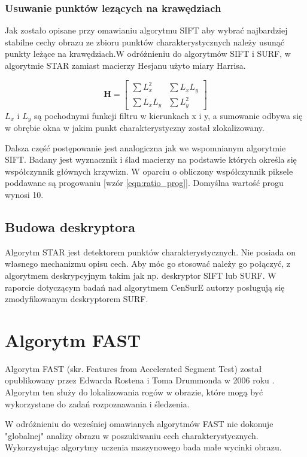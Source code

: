\subsubsection{Usuwanie punktów lezących na krawędziach}
Jak zostało opisane przy omawianiu algorytmu SIFT aby wybrać najbardziej stabilne cechy obrazu ze zbioru punktów charakterystycznych należy usunąć punkty leżące na krawędziach.W odróżnieniu do algorytmów SIFT i SURF, w algorytmie STAR zamiast macierzy Hesjanu użyto miary Harrisa.

\begin{equation}
\textbf{H} = 
\left[\begin{array}{cc}
\sum L_{x}^2&\sum L_{x}L_{y}\\
\sum L_{x}L_{y}&\sum L_{y}^2
\end{array}\right]
\end{equation}
$L_{x}$ i $L_{y}$ są pochodnymi funkcji filtru w kierunkach x i y, a sumowanie odbywa się w obrębie okna w jakim punkt charakterystyczny został zlokalizowany.


Dalsza część postępowanie jest analogiczna jak we wspomnianym algorytmie SIFT. Badany jest wyznacznik i ślad macierzy na podstawie których określa się współczynnik głównych krzywizn. W oparciu o obliczony współczynnik piksele poddawane są progowaniu [wzór \ref{eqn:ratio_prog}]. Domyślna wartość progu wynosi 10.


\subsection{Budowa deskryptora}
Algorytm STAR jest detektorem punktów charakterystycznych. Nie posiada on własnego mechanizmu opisu cech. Aby móc go stosować należy go połączyć, z algorytmem deskrypcyjnym takim jak np. deskryptor SIFT lub SURF. W raporcie dotyczącym badań nad algorytmem CenSurE autorzy posługują się zmodyfikowanym deskryptorem SURF. 




\FloatBarrier
\newpage
\section{Algorytm FAST}
Algorytm FAST (skr. Features from Accelerated Segment Test) został opublikowany przez Edwarda Rostena i Toma Drummonda w 2006 roku \cite{rosten_2006_machine} \cite{rosten_2008_faster}.  Algorytm ten służy do lokalizowania rogów w obrazie, które mogą być wykorzystane do zadań rozpoznawania i śledzenia. 

W odróżnieniu do wcześniej omawianych algorytmów FAST nie dokonuje "globalnej" analizy obrazu w poszukiwaniu cech charakterystycznych. Wykorzystując algorytmy uczenia maszynowego bada małe wycinki obrazu.

